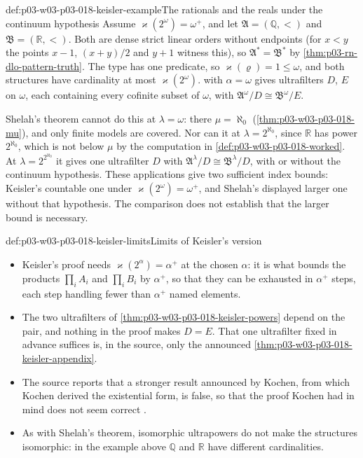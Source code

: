 \begin{hbexample}{def:p03-w03-p03-018-keisler-example}{The rationals and the reals under the continuum hypothesis}
Assume \(\varkappa(2^\omega)=\omega^+\), and let
\(\mathfrak A=(\mathbb Q,<)\) and \(\mathfrak B=(\mathbb R,<)\).  Both are
dense strict linear orders without endpoints (for \(x<y\) the points
\(x-1\), \((x+y)/2\) and \(y+1\) witness this), so
\(\mathfrak A^*=\mathfrak B^*\) by \cref{thm:p03-rn-dlo-pattern-truth}.  The
type has one predicate, so \(\varkappa(\varrho)=1\le\omega\), and both
structures have cardinality at most \(\varkappa(2^\omega)\).
 with \(\alpha=\omega\) gives
ultrafilters \(D\), \(E\) on \(\omega\), each containing every cofinite
subset of \(\omega\), with
\(\mathfrak A^\omega/D\cong\mathfrak B^\omega/E\).

Shelah's theorem cannot do this at \(\lambda=\omega\): there
\(\mu=\aleph_0\) (\cref{thm:p03-w03-p03-018-mu}), and only finite models are
covered.  Nor can it at \(\lambda=2^{\aleph_0}\), since \(\mathbb R\) has
power \(2^{\aleph_0}\), which is not below \(\mu\) by the computation in
\cref{def:p03-w03-p03-018-worked}.  At \(\lambda=2^{2^{\aleph_0}}\) it gives
one ultrafilter \(D\) with
\(\mathfrak A^\lambda/D\cong\mathfrak B^\lambda/D\), with or without the
continuum hypothesis. These applications give two sufficient index bounds:
Keisler's countable one under \(\varkappa(2^\omega)=\omega^+\), and
Shelah's displayed larger one without that hypothesis. The comparison does
not establish that the larger bound is necessary.
\end{hbexample}

\begin{hbwarning}{def:p03-w03-p03-018-keisler-limits}{Limits of Keisler's version}
\begin{itemize}
  \item Keisler's proof needs \(\varkappa(2^\alpha)=\alpha^+\) at the chosen
        \(\alpha\): it is what bounds the products \(\prod_iA_i\) and
        \(\prod_iB_i\) by \(\alpha^+\), so that they can be exhausted in
        \(\alpha^+\) steps, each step handling fewer than \(\alpha^+\)
        named elements.
  \item The two ultrafilters of \cref{thm:p03-w03-p03-018-keisler-powers}
        depend on the pair, and nothing in the proof makes \(D=E\).  That one
        ultrafilter fixed in advance suffices is, in the source, only the
        announced \cref{thm:p03-w03-p03-018-keisler-appendix}.
  \item The source reports that a stronger result announced by Kochen, from
        which Kochen derived the existential form, is false, so that the
        proof Kochen had in mind does not seem correct
        \cite[487, footnote~5]{Keisler1961ElementaryClasses}.
  \item As with Shelah's theorem, isomorphic ultrapowers do not make the
        structures isomorphic: in the example above \(\mathbb Q\) and
        \(\mathbb R\) have different cardinalities.
\end{itemize}
\end{hbwarning}


